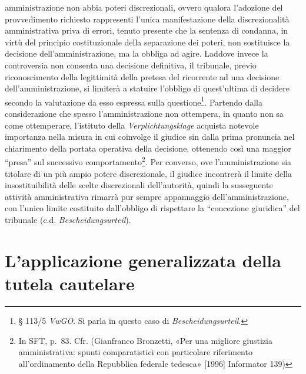 \documentclass[12pt,it,a4paper,]{report}
\begin{document}
amministrazione non abbia poteri discrezionali, ovvero qualora
l'adozione del provvedimento richiesto rappresenti l'unica
manifestazione della discrezionalità amministrativa priva di errori,
tenuto presente che la sentenza di condanna, in virtù del principio
costituzionale della separazione dei poteri, non sostituisce la
decisione dell'amministrazione, ma la obbliga ad agire. Laddove invece
la controversia non consenta una decisione definitiva, il tribunale,
previo riconoscimento della legittimità della pretesa del ricorrente ad
una decisione dell'amministrazione, si limiterà a statuire l'obbligo di
quest'ultima di decidere secondo la valutazione da esso espressa sulla
questione\footnote{§ 113/5 \emph{VwGO}. Si parla in questo caso di
  \emph{Bescheidungsurteil}.}. Partendo dalla considerazione che spesso
l'amministrazione non ottempera, in quanto non sa come ottemperare,
l'istituto della \emph{Verplichtungsklage} acquista notevole importanza
nella misura in cui coinvolge il giudice sin dalla prima pronuncia nel
chiarimento della portata operativa della decisione, ottenendo così una
maggior ``presa'' sul successivo comportamento\footnote{In SFT, p.~83.
  Cfr. (Gianfranco Bronzetti, {«Per una migliore giustizia
  amministrativa: spunti comparatistici con particolare riferimento
  all'ordinamento della Repubblica federale tedesca»} {[}1996{]}
  Informator 139)}. Per converso, ove l'amministrazione sia titolare di
un più ampio potere discrezionale, il giudice incontrerà il limite della
insostituibilità delle scelte discrezionali dell'autorità, quindi la
susseguente attività amministrativa rimarrà pur sempre appannaggio
dell'amministrazione, con l'unico limite costituito dall'obbligo di
rispettare la ``concezione giuridica'' del tribunale (c.d.
\emph{Bescheidungsurteil}).

\hypertarget{lapplicazione-generalizzata-della-tutela-cautelare}{%
\section{L'applicazione generalizzata della tutela
cautelare}\label{lapplicazione-generalizzata-della-tutela-cautelare}}
\end{document}
